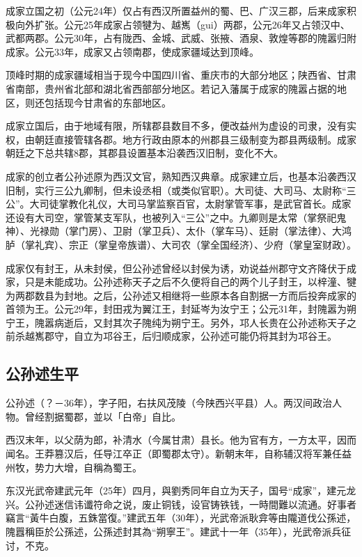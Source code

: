 成家立国之初（公元24年）仅占有西汉所置益州的蜀、巴、广汉三郡，后来成家积极向外扩张。公元25年成家占领犍为、越嶲（gui）两郡，公元26年又占领汉中、武都两郡。公元30年，占有陇西、金城、武威、张掖、酒泉、敦煌等郡的隗嚣归附成家。公元33年，成家又占领南郡，使成家疆域达到顶峰。

顶峰时期的成家疆域相当于现今中国四川省、重庆市的大部分地区；陕西省、甘肃省南部，贵州省北部和湖北省西部部分地区。若记入藩属于成家的隗嚣占据的地区，则还包括现今甘肃省的东部地区。

成家立国后，由于地域有限，所辖郡县数目不多，便改益州为虚设的司隶，没有实权，由朝廷直接管辖各郡。地方行政由原本的州郡县三级制变为郡县两级制。成家朝廷之下总共辖8郡，其郡县设置基本沿袭西汉旧制，变化不大。

成家的创立者公孙述原为西汉文官，熟知西汉典章。成家建立后，也基本沿袭西汉旧制，实行三公九卿制，但未设丞相（或类似官职）。大司徒、大司马、太尉称“三公”。大司徒掌教化礼仪，大司马掌监察百官，太尉掌管军事，是武官首长。成家还设有大司空，掌管某支军队，也被列入“三公”之中。九卿则是太常（掌祭祀鬼神）、光禄勋（掌门房）、卫尉（掌卫兵）、太仆（掌车马）、廷尉（掌法律）、大鸿胪（掌礼宾）、宗正（掌皇帝族谱）、大司农（掌全国经济）、少府（掌皇室财政）。

成家仅有封王，从未封侯，但公孙述曾经以封侯为诱，劝说益州郡守文齐降伏于成家，只是未能成功。公孙述称天子之后不久便将自己的两个儿子封王，以梓潼、犍为两郡数县为封地。之后，公孙述又相继将一些原本各自割据一方而后投奔成家的首领为王。公元29年，封田戎为翼江王，封延岑为汝宁王；公元31年，封隗嚣为朔宁王，隗嚣病逝后，又封其次子隗纯为朔宁王。另外，邛人长贵在公孙述称天子之前杀越嶲郡守，自立为邛谷王，后归顺成家，公孙述可能仍将其封为邛谷王。

\subsection{公孙述生平}

公孙述（？－36年），字子阳，右扶风茂陵（今陕西兴平县）人。两汉间政治人物。曾经割据蜀郡，並以「白帝」自比。

西汉末年，以父荫为郎，补清水（今属甘肃）县长。他为官有方，一方太平，因而闻名。王莽篡汉后，任导江卒正（即蜀郡太守）。新朝末年，自称辅汉将军兼任益州牧，势力大增，自稱為蜀王。

东汉光武帝建武元年（25年）四月，與劉秀同年自立为天子，国号“成家”，建元龙兴。公孙述迷信讳谶符命之说，废止铜钱，设官铸铁钱，一時間難以流通。好事者竊言“黃牛白腹，五銖當復。”建武五年（30年），光武帝派耿弇等由隴道伐公孫述，隗囂稱臣於公孫述，公孫述封其為“朔寧王”。建武十一年（35年），光武帝派兵征讨，不克。

